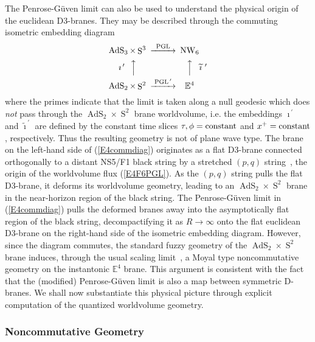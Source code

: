\documentclass[11pt,a4paper]{article}
\DeclareMathOperator{\AdS}{AdS}
\DeclareMathOperator{\Sphere}{S}
\DeclareMathOperator{\NW}{NW}
\let\S\Sphere
\newcommand{\eucl}{{\mathbb E}}
\begin{document}
The Penrose-G\"uven limit can also be used to understand the physical
origin of the euclidean D3-branes. They may be described
through the commuting isometric embedding diagram
\begin{equation}
  \label{E4commdiag}
  \begin{CD}
    \AdS_3 \times \S^3             @>\text{PGL}>> \NW_6\\
    \text{$\imath^{\,\prime}~~$}@AAA
@AAA\text{$\widetilde{\imath}^{~\prime}$}\\
    \AdS_2 \times \S^2             @>\text{PGL$^{\,\prime}$}>> \eucl^4\\
  \end{CD}
\end{equation}
where the primes indicate that the limit is taken along a null geodesic
which does {\it not} pass through the $\AdS_2\times\S^2$ brane
worldvolume, i.e. the embeddings $\imath^{\,\prime}$ and
$\widetilde{\imath}^{~\prime}$ are defined by the constant time
slices $\tau,\phi={\rm constant}$ and $x^+={\rm constant}$, respectively. Thus
the resulting geometry is not of plane wave type. The brane on the
left-hand side of (\ref{E4commdiag}) originates as a flat D3-brane
connected orthogonally to a distant NS5/F1 black string by a stretched
$(p,q)$ string~\cite{BP1}, the origin of the worldvolume flux
(\ref{E4F6PGL}). As the $(p,q)$ string pulls the flat D3-brane, it
deforms its worldvolume geometry, leading to an $\AdS_2\times\S^2$
brane in the near-horizon region of the black string. The
Penrose-G\"uven limit in (\ref{E4commdiag}) pulls the deformed branes
away into the asymptotically flat region of the black string,
decompactifying it as $R\to\infty$ onto the flat euclidean D3-brane
on the right-hand side of the isometric embedding diagram. However,
since the diagram commutes, the standard fuzzy geometry of the
$\AdS_2\times\S^2$ brane induces, through the usual scaling limit~\cite{CMS1},
a
Moyal type noncommutative geometry on the instantonic $\eucl^4$
brane. This argument is consistent with the fact that the (modified)
Penrose-G\"uven limit is also a map between symmetric D-branes. We
shall now substantiate this physical picture through explicit
computation of the quantized worldvolume geometry.

\subsubsection*{Noncommutative Geometry}
\end{document}
